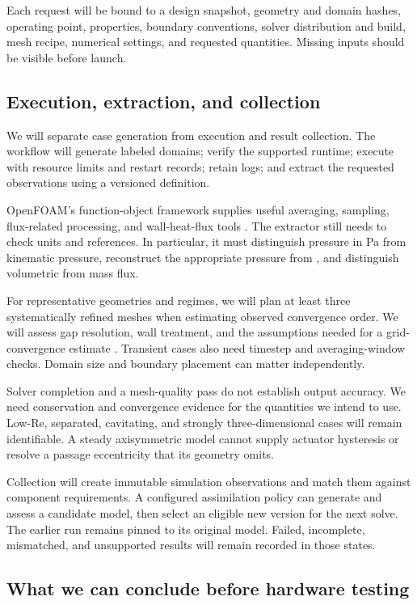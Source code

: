Each request will be bound to a design snapshot, geometry and domain hashes, operating point, properties, boundary conventions, solver distribution and build, mesh recipe, numerical settings, and requested quantities. Missing inputs should be visible before launch.

\subsection{Execution, extraction, and collection}

We will separate case generation from execution and result collection. The workflow will generate labeled domains; verify the supported runtime; execute with resource limits and restart records; retain logs; and extract the requested observations using a versioned definition.

OpenFOAM's function-object framework supplies useful averaging, sampling, flux-related processing, and wall-heat-flux tools \cite{openfoam13}. The extractor still needs to check units and references. In particular, it must distinguish pressure in Pa from kinematic pressure, reconstruct the appropriate pressure from , and distinguish volumetric from mass flux.

For representative geometries and regimes, we will plan at least three systematically refined meshes when estimating observed convergence order. We will assess gap resolution, wall treatment, and the assumptions needed for a grid-convergence estimate \cite{nasagrid}. Transient cases also need timestep and averaging-window checks. Domain size and boundary placement can matter independently.

Solver completion and a mesh-quality pass do not establish output accuracy. We need conservation and convergence evidence for the quantities we intend to use. Low-Re, separated, cavitating, and strongly three-dimensional cases will remain identifiable. A steady axisymmetric model cannot supply actuator hysteresis or resolve a passage eccentricity that its geometry omits.

Collection will create immutable simulation observations and match them against component requirements. A configured assimilation policy can generate and assess a candidate model, then select an eligible new version for the next solve. The earlier run remains pinned to its original model. Failed, incomplete, mismatched, and unsupported results will remain recorded in those states.

\subsection{What we can conclude before hardware testing}

